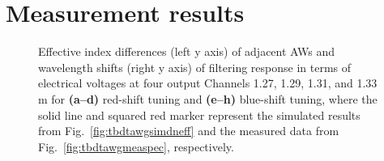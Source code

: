 \section{Measurement results} \label{sec:3.3}
    \lipsum
    \begin{figure}[!b]
        \noindent{}
		\centering
		\caption{\label{fig:tbdtawgmeadneff_vb}Effective index differences (left y axis) of adjacent AWs and wavelength shifts (right
                                            y axis) of filtering response in terms of electrical voltages at four output Channels 1.27, 1.29,
                                            1.31, and 1.33 \textmu m for \textbf{(a--d)} red-shift tuning and \textbf{(e--h)} blue-shift tuning, 
                                            where the solid line and squared red marker represent the simulated results from Fig.~\ref{fig:tbdtawgsimdneff} 
                                            and the measured data from Fig.~\ref{fig:tbdtawgmeaspec}, respectively.}
	\end{figure}
    \lipsum
